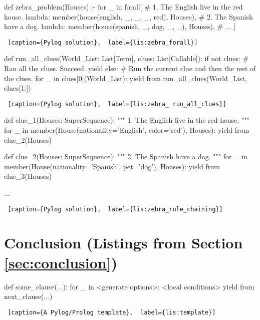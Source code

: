 \noindent
\begin{minipage}{\linewidth} \largev
\begin{python}
def zebra_problem(Houses) :-
    for _ in forall{[
        # 1. The English live in the red house.
        lambda: member(house(english, _, _, _, red), Houses), 
        # 2. The Spanish have a dog.
        lambda: member(house(spanish, _, dog, _, _), Houses), 
        # ...
        ]}
\end{python}
\begin{lstlisting} [caption={Pylog solution},  label={lis:zebra_forall}]
\end{lstlisting}
\end{minipage}

\noindent
\begin{minipage}{\linewidth} \largev
\begin{python}
def run_all_clues(World_List: List[Term], clues: List[Callable]):
    if not clues:
      # Ran all the clues. Succeed.
      yield
    else:
      # Run the current clue and then the rest of the clues.
      for _ in clues[0](World_List):
        yield from run_all_clues(World_List, clues[1:])
\end{python}
\begin{lstlisting} [caption={Pylog solution},  label={lis:zebra_ run_all_clues}]
\end{lstlisting}
\end{minipage}

\noindent
\begin{minipage}{\linewidth} \largev
\begin{python}
  def clue_1(Houses: SuperSequence):
    """ 1. The English live in the red house.  """
    for _ in member(House(nationality='English', color='red'), Houses):
      yield from clue_2(Houses)

  def clue_2(Houses: SuperSequence):
    """ 2. The Spanish have a dog. """
    for _ in member(House(nationality='Spanish', pet='dog'), Houses):
      yield from clue_3(Houses)
      
  ...
\end{python}
\begin{lstlisting} [caption={Pylog solution},  label={lis:zebra_rule_chaining}]
\end{lstlisting}
\end{minipage}

\section{Conclusion (Listings from Section \ref{sec:conclusion})} \label{appsec:conclusion}

\begin{minipage}{\linewidth}
\hrulefill
\begin{python}
   def some_clause(...):
     for _ in <generate options>:
       <local conditions>
       yield from next_clause(...)
\end{python}
\begin{lstlisting} [caption={A Pylog/Prolog template},  label={lis:template}]
\end{lstlisting}
\end{minipage}
